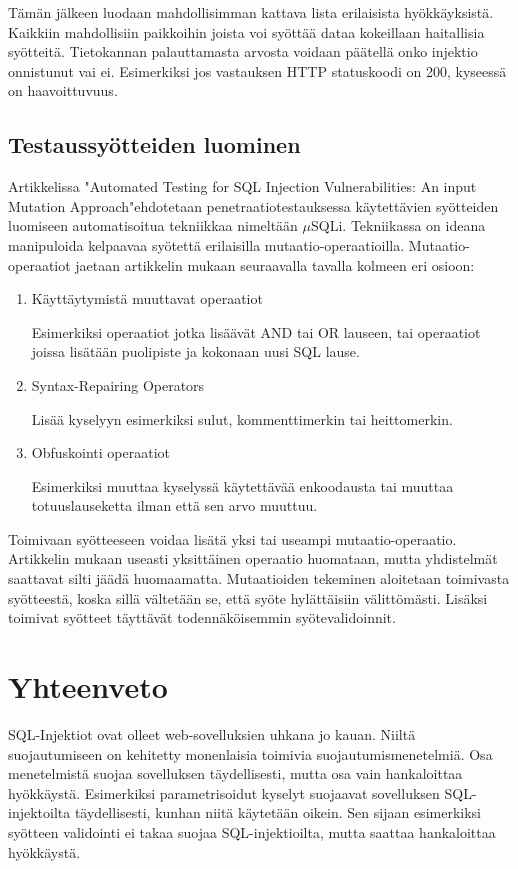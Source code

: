 \documentclass[finnish]{tktltiki2}
\theoremstyle{definition}
\theoremstyle{remark}
\begin{document}
	Tämän jälkeen luodaan mahdollisimman kattava lista erilaisista hyökkäyksistä. Kaikkiin mahdollisiin paikkoihin joista voi syöttää dataa kokeillaan haitallisia syötteitä. Tietokannan palauttamasta arvosta voidaan päätellä onko injektio onnistunut vai ei. Esimerkiksi jos vastauksen HTTP statuskoodi on 200, kyseessä on haavoittuvuus.
	
	\subsection{Testaussyötteiden luominen}
	Artikkelissa "Automated Testing for SQL Injection Vulnerabilities: An input Mutation Approach"\cite{generation}\space ehdotetaan penetraatiotestauksessa käytettävien syötteiden luomiseen automatisoitua tekniikkaa nimeltään $\mu$SQLi. Tekniikassa on ideana manipuloida kelpaavaa syötettä erilaisilla mutaatio-operaatioilla. Mutaatio-operaatiot jaetaan artikkelin mukaan seuraavalla tavalla kolmeen eri osioon:
	\begin{enumerate}
	\item Käyttäytymistä muuttavat operaatiot
	
	Esimerkiksi operaatiot jotka lisäävät AND tai OR lauseen, tai operaatiot joissa lisätään puolipiste ja kokonaan uusi SQL lause. 
	
	\item Syntax-Repairing Operators
	
	Lisää kyselyyn esimerkiksi sulut, kommenttimerkin tai heittomerkin.
	
	\item Obfuskointi operaatiot
	
	Esimerkiksi muuttaa kyselyssä käytettävää enkoodausta tai muuttaa totuuslauseketta ilman että sen arvo muuttuu.
	\end{enumerate}
	
	Toimivaan syötteeseen voidaa lisätä yksi tai useampi mutaatio-operaatio. Artikkelin mukaan useasti yksittäinen operaatio huomataan, mutta yhdistelmät saattavat silti jäädä huomaamatta. Mutaatioiden tekeminen aloitetaan toimivasta syötteestä, koska sillä vältetään se, että syöte hylättäisiin välittömästi. Lisäksi toimivat syötteet täyttävät todennäköisemmin syötevalidoinnit. 
	
	\section {Yhteenveto}
	SQL-Injektiot ovat olleet web-sovelluksien uhkana jo kauan. Niiltä suojautumiseen on kehitetty monenlaisia toimivia suojautumismenetelmiä. Osa menetelmistä suojaa sovelluksen täydellisesti, mutta osa vain hankaloittaa hyökkäystä. Esimerkiksi parametrisoidut kyselyt suojaavat sovelluksen SQL-injektoilta täydellisesti, kunhan niitä käytetään oikein. Sen sijaan esimerkiksi syötteen validointi ei takaa suojaa SQL-injektioilta, mutta saattaa hankaloittaa hyökkäystä.
	
\end{document}
